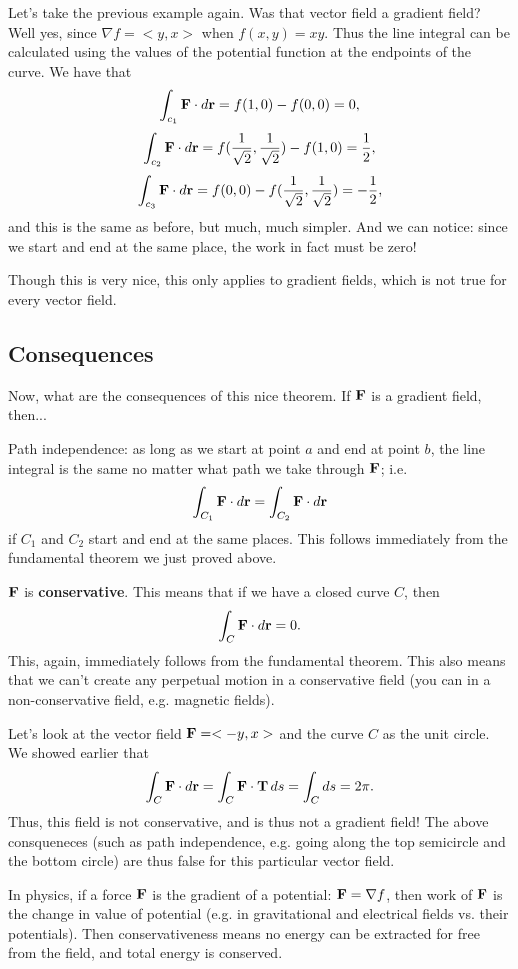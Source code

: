\bex
Let's take the previous example again. Was that vector field a gradient field? Well yes, since $\nabla f = <y,x>$ when $f(x,y) = xy$. Thus the line integral can be calculated using the values of the potential function at the endpoints of the curve. We have that
\[ \int_{c_1} \boldsymbol{\mathbf{F}} \cdot d\boldsymbol{\mathbf{r}} = f(1,0) - f(0,0) = 0, \]
\[ \int_{c_2} \boldsymbol{\mathbf{F}} \cdot d\boldsymbol{\mathbf{r}} = f(\frac1{\sqrt{2}},\frac1{\sqrt{2}}) - f(1,0) = \frac 12, \]
\[ \int_{c_3} \boldsymbol{\mathbf{F}} \cdot d\boldsymbol{\mathbf{r}} = f(0,0) - f(\frac1{\sqrt{2}},\frac1{\sqrt{2}}) = -\frac 12, \]
and this is the same as before, but much, much simpler. And we can notice: since we start and end at the same place, the work in fact must be zero!
\eex

\bdb
Though this is very nice, this only applies to gradient fields, which is not true for every vector field.
\edb

\subsection{Consequences}
Now, what are the consequences of this nice theorem. If $\boldsymbol{\mathbf{F}}$ is a gradient field, then...
\ben
\item Path independence: as long as we start at point $a$ and end at point $b$, the line integral is the same no matter what path we take through $\boldsymbol{\mathbf{F}}$; i.e.
\[ \int_{C_1} \boldsymbol{\mathbf{F}} \cdot d\boldsymbol{\mathbf{r}} =  \int_{C_2} \boldsymbol{\mathbf{F}} \cdot d\boldsymbol{\mathbf{r}} \]
if $C_1$ and $C_2$ start and end at the same places. This follows immediately from the fundamental theorem we just proved above.
\item $\boldsymbol{\mathbf{F}}$ is \textbf{conservative}. This means that if we have a closed curve $C$, then
\[ \int_C \boldsymbol{\mathbf{F}} \cdot d\boldsymbol{\mathbf{r}} = 0. \]
This, again, immediately follows from the fundamental theorem. This also means that we can't create any perpetual motion in a conservative field (you can in a non-conservative field, e.g. magnetic fields). 
\een 

\brm
Let's look at the vector field $\boldsymbol{\mathbf{F}} = <-y,x>$ and the curve $C$ as the unit circle. We showed earlier that
\[ \int_C \boldsymbol{\mathbf{F}} \cdot d\boldsymbol{\mathbf{r}} = \int_C \boldsymbol{\mathbf{F}} \cdot \boldsymbol{\mathbf{T}} \,ds = \int_C ds = 2\pi. \]
Thus, this field is not conservative, and is thus not a gradient field! The above consqueneces (such as path independence, e.g. going along the top semicircle and the bottom circle) are thus false for this particular vector field.
\erm

\bex
In physics, if a force $\boldsymbol{\mathbf{F}}$ is the gradient of a potential: $\boldsymbol{\mathbf{F}} = \nabla f$, then work of $\boldsymbol{\mathbf{F}}$ is the change in value of potential (e.g. in gravitational and electrical fields vs. their potentials). Then conservativeness means no energy can be extracted for free from the field, and total energy is conserved.
\eex

